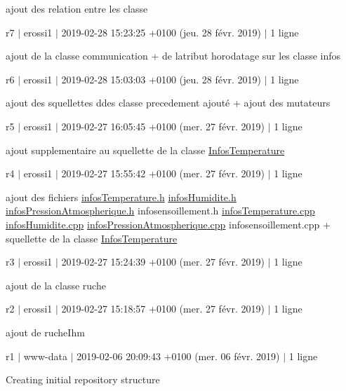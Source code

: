 ajout des relation entre les classe

r7 $\vert$ erossi1 $\vert$ 2019-\/02-\/28 15\+:23\+:25 +0100 (jeu. 28 févr. 2019) $\vert$ 1 ligne

ajout de la classe communication + de l\textquotesingle{}atribut horodatage sur les classe infos

r6 $\vert$ erossi1 $\vert$ 2019-\/02-\/28 15\+:03\+:03 +0100 (jeu. 28 févr. 2019) $\vert$ 1 ligne

ajout des squellettes ddes classe precedement ajouté + ajout des mutateurs

r5 $\vert$ erossi1 $\vert$ 2019-\/02-\/27 16\+:05\+:45 +0100 (mer. 27 févr. 2019) $\vert$ 1 ligne

ajout supplementaire au squellette de la classe \hyperlink{class_infos_temperature}{Infos\+Temperature}

r4 $\vert$ erossi1 $\vert$ 2019-\/02-\/27 15\+:55\+:42 +0100 (mer. 27 févr. 2019) $\vert$ 1 ligne

ajout des fichiers \hyperlink{infos_temperature_8h}{infos\+Temperature.\+h} \hyperlink{infos_humidite_8h}{infos\+Humidite.\+h} \hyperlink{infos_pression_atmospherique_8h}{infos\+Pression\+Atmospherique.\+h} infosensoillement.\+h \hyperlink{infos_temperature_8cpp}{infos\+Temperature.\+cpp} \hyperlink{infos_humidite_8cpp}{infos\+Humidite.\+cpp} \hyperlink{infos_pression_atmospherique_8cpp}{infos\+Pression\+Atmospherique.\+cpp} infosensoillement.\+cpp + squellette de la classe \hyperlink{class_infos_temperature}{Infos\+Temperature}

r3 $\vert$ erossi1 $\vert$ 2019-\/02-\/27 15\+:24\+:39 +0100 (mer. 27 févr. 2019) $\vert$ 1 ligne

ajout de la classe ruche

r2 $\vert$ erossi1 $\vert$ 2019-\/02-\/27 15\+:18\+:57 +0100 (mer. 27 févr. 2019) $\vert$ 1 ligne

ajout de ruche\+Ihm

r1 $\vert$ www-\/data $\vert$ 2019-\/02-\/06 20\+:09\+:43 +0100 (mer. 06 févr. 2019) $\vert$ 1 ligne

Creating initial repository structure 